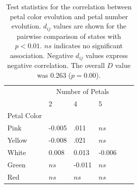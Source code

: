 \documentclass[review]{elsarticle}
\begin{document}
\begin{table}
   \center
   \begin{adjustbox}{max width=\textwidth}
      \setlength{\tabcolsep}{20pt}
      \begin{tabular}{llllll}
         \toprule
	 & \multicolumn{3}{c}{Number of Petals} \\
         & 2 & 4 & 5 \\ 
	 \cmidrule{2-4}
	 Petal Color \\
         \hspace{3 mm} Pink & -0.005 & .011 & $ns$ \\
	 \hspace{3 mm} Yellow & -0.008 & .021 & $ns$ \\
	 \hspace{3 mm} White & 0.008 & 0.013 & -0.006 \\
	 \hspace{3 mm} Green & $ns$ & -0.011 & $ns$ \\
	 \hspace{3 mm} Red & $ns$ & $ns$ & $ns$ \\
         \bottomrule
      \end{tabular}
   \end{adjustbox}
   \caption{Test statistics for the correlation between petal color evolution and petal number evolution. 
	    $d_{ij}$ values are shown
            for the pairwise comparison of states with $p< 0.01$. $ns$ indicates no significant
	    association. Negative $d_{ij}$ values express negative correlation.
	    The overall $D$ value was 0.263 ($p=0.00$).
	    }
   \label{correlations}
\end{table}
\end{document}
